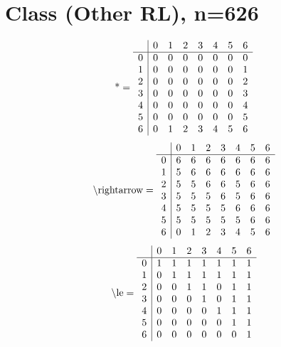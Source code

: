\documentclass[11pt]{article}
\begin{document}
\section{Class (Other RL), n=626}
\[\text{*} = 
\begin{array}{r | r r r r r r r}
 & 0 & 1 & 2 & 3 & 4 & 5 & 6 \\ \hline
0 & 0 & 0 & 0 & 0 & 0 & 0 & 0 \\
1 & 0 & 0 & 0 & 0 & 0 & 0 & 1 \\
2 & 0 & 0 & 0 & 0 & 0 & 0 & 2 \\
3 & 0 & 0 & 0 & 0 & 0 & 0 & 3 \\
4 & 0 & 0 & 0 & 0 & 0 & 0 & 4 \\
5 & 0 & 0 & 0 & 0 & 0 & 0 & 5 \\
6 & 0 & 1 & 2 & 3 & 4 & 5 & 6 \\
\end{array}
\]
\[\text{\textbackslash rightarrow} = 
\begin{array}{r | r r r r r r r}
 & 0 & 1 & 2 & 3 & 4 & 5 & 6 \\ \hline
0 & 6 & 6 & 6 & 6 & 6 & 6 & 6 \\
1 & 5 & 6 & 6 & 6 & 6 & 6 & 6 \\
2 & 5 & 5 & 6 & 6 & 5 & 6 & 6 \\
3 & 5 & 5 & 5 & 6 & 5 & 6 & 6 \\
4 & 5 & 5 & 5 & 5 & 6 & 6 & 6 \\
5 & 5 & 5 & 5 & 5 & 5 & 6 & 6 \\
6 & 0 & 1 & 2 & 3 & 4 & 5 & 6 \\
\end{array}
\]
\[\text{\textbackslash le} = 
\begin{array}{r | r r r r r r r}
 & 0 & 1 & 2 & 3 & 4 & 5 & 6 \\ \hline
0 & 1 & 1 & 1 & 1 & 1 & 1 & 1 \\
1 & 0 & 1 & 1 & 1 & 1 & 1 & 1 \\
2 & 0 & 0 & 1 & 1 & 0 & 1 & 1 \\
3 & 0 & 0 & 0 & 1 & 0 & 1 & 1 \\
4 & 0 & 0 & 0 & 0 & 1 & 1 & 1 \\
5 & 0 & 0 & 0 & 0 & 0 & 1 & 1 \\
6 & 0 & 0 & 0 & 0 & 0 & 0 & 1 \\
\end{array}
\]
\end{document}

